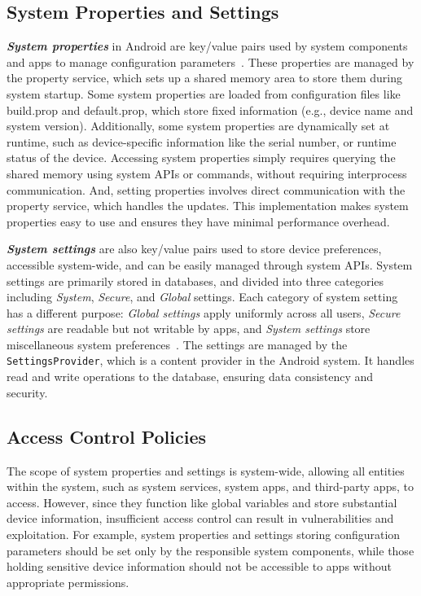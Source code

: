 \subsection{System Properties and Settings}
\label{sec:background1}
\textit{\textbf{System properties}} in Android are key/value pairs used by system components and apps to manage configuration parameters~\cite{system_properties}.
These properties are managed by the property service, which sets up a shared memory area to store them during system startup. 
Some system properties are loaded from configuration files like build.prop and default.prop, which store fixed information (e.g., device name and system version).
Additionally, some system properties are dynamically set at runtime, such as device-specific information like the serial number, or runtime status of the device.
Accessing system properties simply requires querying the shared memory using system APIs or commands, without requiring interprocess communication.
And, setting properties involves direct communication with the property service, which handles the updates. 
This implementation makes system properties easy to use and ensures they have minimal performance overhead.

\textit{\textbf{System settings}} are also key/value pairs used to store device preferences, accessible system-wide, and can be easily managed through system APIs.
System settings are primarily stored in databases, and divided into three categories including \textit{System}, \textit{Secure}, and \textit{Global} settings.
Each category of system setting has a different purpose: \textit{Global settings} apply uniformly across all users, \textit{Secure settings} are readable but not writable by apps, and \textit{System settings} store miscellaneous system preferences~\cite{system_settings}.
The settings are managed by the \texttt{SettingsProvider}, which is a content provider in the Android system. 
It handles read and write operations to the database, ensuring data consistency and security.

\subsection{Access Control Policies}
\label{sec:background2}

The scope of system properties and settings is system-wide, allowing all entities within the system, such as system services, system apps, and third-party apps, to access.
However, since they function like global variables and store substantial device information, insufficient access control can result in vulnerabilities and exploitation.
For example, system properties and settings storing configuration parameters should be set only by the responsible system components, while those holding sensitive device information should not be accessible to apps without appropriate permissions.


